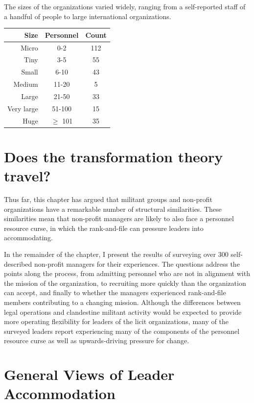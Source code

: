 The sizes of the organizations varied widely, ranging from a self-reported staff of a handful of people to large international organizations. %

 \begin{table}[ht]
 \centering
 \begin{tabular}{rcc}
   \hline
  Size & Personnel &  Count \\
   \hline
 Micro & 0-2 &112 \\
   Tiny &3-5 & 55 \\
   Small & 6-10 &  43 \\
   Medium & 11-20 &  5 \\
   Large & 21-50 &33 \\
   Very large & 51-100 &  15 \\
   Huge & $\geq$ 101 & 35 \\
    \hline
 \end{tabular}
 \end{table} 
 
\section{Does the transformation theory travel?}

Thus far, this chapter has argued that militant groups and non-profit organizations have a remarkable number of structural similarities. These similarities mean that non-profit managers are likely to also face a personnel resource curse, in which the rank-and-file can pressure leaders into accommodating.

In the remainder of the chapter, I present the results of surveying over 300 self-described non-profit managers for their experiences.  The questions address the points along the process, from admitting personnel who are not in alignment with the mission of the organization, to recruiting more quickly than the organization can accept, and finally to whether the managers experienced rank-and-file members contributing to a changing mission. Although the differences between legal operations and clandestine militant activity would be expected to provide more operating flexibility for leaders of the licit organizations, many of the surveyed leaders report experiencing many of the components of the personnel resource curse as well as upwards-driving pressure for change.

\section{General Views of Leader Accommodation}

